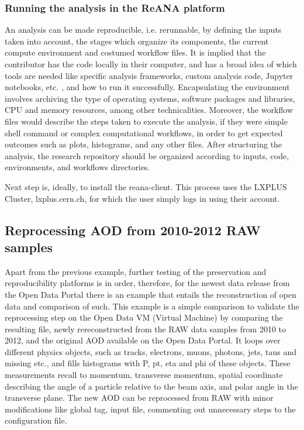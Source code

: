\documentclass[letter]{article}
\newcommand\tab[1][1cm]{\hspace*{#1}}
\begin{document}
\subsubsection{Running the analysis in the ReANA platform}
\tab An analysis can be made reproducible, i.e. rerunnable, by defining the inputs taken into account, the stages which organize its components, the current compute environment and costumed workflow files. It is implied that the contributor has the code locally in their computer, and has a broad idea of which tools are needed like specific analysis frameworks, custom analysis code, Jupyter notebooks, etc. , and how to run it successfully. Encapsulating the environment involves archiving the type of operating systems, software packages and libraries, CPU and memory resources, among other technicalities. Moreover, the workflow files would describe the steps taken to execute the analysis, if they were simple shell command or complex computational workflows, in order to get expected outcomes such as plots, histograms, and any other files. After structuring the analysis, the research repository should be organized according to inputs, code, environments, and workflows directories. 

Next step is, ideally, to install the reana-client. This process uses the LXPLUS Cluster, lxplus.cern.ch, for which the user simply logs in using their account. 


\subsection{Reprocessing AOD from 2010-2012 RAW samples}
\tab Apart from the previous example, further testing of the preservation and reproducibility platforms is in order, therefore, for the newest data release from the Open Data Portal there is an example that entails the reconstruction of open data and comparison of such. 
This example is a simple comparison to validate the reprocessing step on the Open Data VM (Virtual Machine) by comparing the resulting file, newly rereconstructed from the RAW data samples from 2010 to 2012, and the original AOD available on the Open Data Portal. It loops over different physics objects, such as tracks, electrons, muons, photons, jets, taus and missing etc., and fills histograms with P, pt, eta and phi of these objects. These measurements recall to momentum, transverse momentum, spatial coordinate describing the angle of a particle relative to the beam axis, and polar angle in the transverse plane. The new AOD can be reprocessed from RAW with minor modifications like global tag, input file, commenting out unnecessary steps to the configuration file. 
\end{document}
